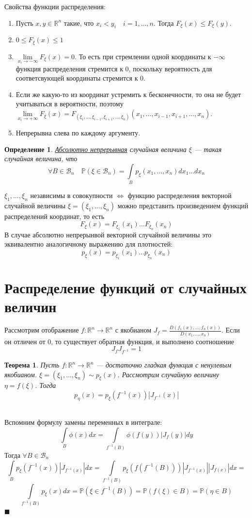 \documentclass[12pt]{article}
\newtheorem{Th}{Теорема}
\newtheorem{Def}{Определение}
\newenvironment{Proof}{\par\noindent{\bf Доказательство}}{$\blacksquare$}
\numberwithin{Th}{section}
\numberwithin{Def}{section}
\numberwithin{Lem}{section}
\numberwithin{St}{section}
\numberwithin{equation}{section}
\newcommand\Pro{\mathbb{P}} %
\newcommand\Bor{\mathscr{B}} %
\newcommand\Real{\mathbb{R}} %
\begin{document}
Свойства функции распределения:
\begin{enumerate}
	\item Пусть $x, y \in \Real^n$ такие, что $x_i < y_i \quad i = 1, \ldots, n$. Тогда $F_\xi(x) \le F_\xi(y)$.
	\item $0 \le F_\xi(x) \le 1$
	\item $\lim\limits_{x_i \to -\infty} F_\xi(x) = 0$. То есть при стремлении одной координаты к $-\infty$ функция распределения стремится к 0, поскольку вероятность для соответсвующей координаты стремится к 0.
	\item Если же какую-то из координат устремить к бесконечности, то она не будет учитываться в вероятности, поэтому 
	$\lim\limits_{x_i \to +\infty} F_\xi(x) = F_{(\xi_1, \ldots, \xi_{i-1}, \xi_{i+1}, \ldots, \xi_n)}(x_1, \ldots, x_{i-1}, x_{i+1}, \ldots, x_n)$.
	\item Непрерывна слева по каждому аргументу.
\end{enumerate}

\begin{Def}
\underline{Абсолютно непрерывная} случайная величина $\xi$ --- такая случайная величина, что
$$\forall B \in \Bor_n \quad \Pro(\xi \in \Bor_n) = \int\limits_B p_\xi(x_1, \ldots, x_n)dx_1\ldots dx_n$$ 
\end{Def}

$\xi_1, \ldots, \xi_n$ независимы в совокупности $\Leftrightarrow$ функцию распределения векторной случайной величины $\xi = (\xi_1, \ldots, \xi_n)$ можно представить произведением функций распределений координат, то есть 
$$F_\xi(x) = F_{\xi_1}(x_1)\ldots F_{\xi_n}(x_n)$$
В случае абсолютно непрерынвой векторной случайной величины это эквивалентно аналогичному выражению для плотностей:
$$p_\xi(x) = p_{\xi_1}(x_1)\ldots p_{\xi_n}(x_n)$$

\newpage
\section{Распределение функций от случайных величин}
Рассмотрим отображение $f\colon \Real^n \to \Real^n$ с якобианом $J_f = \frac{D(f_1(x), \ldots, f_n(x))}{D(x_1, \ldots, x_n)}$.
Если он отличен от 0, то существует обратная функция, и выполнено соотношение
$$J_fJ_{f^{-1}} = 1$$

\begin{Th}
Пусть  $f\colon \Real^n \to \Real^n$ --- достаточно гладкая функция с ненулевым якобианом. $\xi = (\xi_1, \ldots, \xi_n) \sim p_\xi(x)$. Рассмотрим случайную величину $\eta = f(\xi)$. Тогда
$$p_\eta(x) = p_\xi(f^{-1}(x))|J_{f^{-1}}(x)|$$
\end{Th}
\begin{Proof} \\
Вспомним формулу замены переменных в интеграле:
$$\int\limits_B \phi(x)dx = \int\limits_{f^{-1}(B)} \phi(f(y))|J_f(y)|dy$$
Тогда $\forall B \in \Bor_n$
$$\int\limits_B p_\xi(f^{-1}(x))|J_{f^{-1}(x)}|dx = \int\limits_{f^{-1}(B)} p_\xi(f(f^{-1}(B)))|J_{f^{-1}(x)}||J_{f(x)}|dx =$$
$$ \int\limits_{f^{-1}(B)}p_\xi(x)dx = \Pro(\xi \in f^{-1}(B)) =\Pro(f(\xi) \in B) = \Pro(\eta \in B)$$
\end{Proof}
\end{document}
